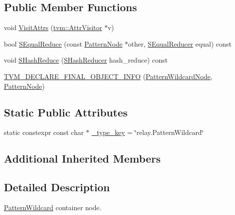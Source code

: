 \subsection*{Public Member Functions}
\begin{DoxyCompactItemize}
\item 
void \hyperlink{classtvm_1_1relay_1_1PatternWildcardNode_a9ffcf271d30a3b44be05f0451975ca3b}{Visit\+Attrs} (\hyperlink{classtvm_1_1AttrVisitor}{tvm\+::\+Attr\+Visitor} $\ast$v)
\item 
bool \hyperlink{classtvm_1_1relay_1_1PatternWildcardNode_af0305f7169d80d92d8f2496c28677c93}{S\+Equal\+Reduce} (const \hyperlink{classtvm_1_1relay_1_1PatternNode}{Pattern\+Node} $\ast$other, \hyperlink{classtvm_1_1SEqualReducer}{S\+Equal\+Reducer} equal) const 
\item 
void \hyperlink{classtvm_1_1relay_1_1PatternWildcardNode_aa6c412ce0759d5037ccabd91eeb9a176}{S\+Hash\+Reduce} (\hyperlink{classtvm_1_1SHashReducer}{S\+Hash\+Reducer} hash\+\_\+reduce) const 
\item 
\hyperlink{classtvm_1_1relay_1_1PatternWildcardNode_a527305449e48d7f60d532bf48c0eb800}{T\+V\+M\+\_\+\+D\+E\+C\+L\+A\+R\+E\+\_\+\+F\+I\+N\+A\+L\+\_\+\+O\+B\+J\+E\+C\+T\+\_\+\+I\+N\+FO} (\hyperlink{classtvm_1_1relay_1_1PatternWildcardNode}{Pattern\+Wildcard\+Node}, \hyperlink{classtvm_1_1relay_1_1PatternNode}{Pattern\+Node})
\end{DoxyCompactItemize}
\subsection*{Static Public Attributes}
\begin{DoxyCompactItemize}
\item 
static constexpr const char $\ast$ \hyperlink{classtvm_1_1relay_1_1PatternWildcardNode_aec29789ceabf251361f8abc2017a5f8a}{\+\_\+type\+\_\+key} = \char`\"{}relay.\+Pattern\+Wildcard\char`\"{}
\end{DoxyCompactItemize}
\subsection*{Additional Inherited Members}


\subsection{Detailed Description}
\hyperlink{classtvm_1_1relay_1_1PatternWildcard}{Pattern\+Wildcard} container node. 

